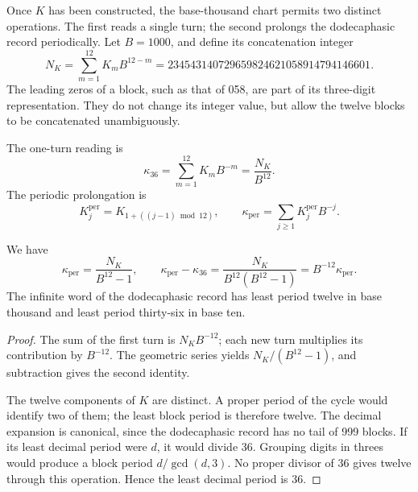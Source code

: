 Once \(K\) has been constructed, the base-thousand chart permits two
distinct operations. The first reads a single turn; the second prolongs the dodecaphasic record
periodically. Let \(B=1000\), and define its concatenation integer
\begin{equation}
 N_K=\sum_{m=1}^{12}K_mB^{12-m}
 =234543140729659824621058914794146601.
 \label{eq:k-numerador}
\end{equation}
The leading zeros of a block, such as that of 058, are part of its
three-digit representation. They do not change its integer value, but allow
the twelve blocks to be concatenated unambiguously.

\begin{definition}
\label{def:k-kappas}
The one-turn reading is
\[
 \kappa_{36}=\sum_{m=1}^{12}K_mB^{-m}=\frac{N_K}{B^{12}}.
\]
The periodic prolongation is
\[
 K_j^{\mathrm{per}}=K_{1+((j-1)\bmod12)},\qquad
 \kappa_{\mathrm{per}}=\sum_{j\geq1}K_j^{\mathrm{per}}B^{-j}.
\]
\end{definition}

\begin{proposition}
\label{prop:k-periodo}
We have
\begin{equation}
 \kappa_{\mathrm{per}}=\frac{N_K}{B^{12}-1},\qquad
 \kappa_{\mathrm{per}}-\kappa_{36}
 =\frac{N_K}{B^{12}(B^{12}-1)}
 =B^{-12}\kappa_{\mathrm{per}}.
 \label{eq:k-diferencia-kappas}
\end{equation}
The infinite word of the dodecaphasic record has least period twelve in base thousand and
least period thirty-six in base ten.
\end{proposition}

\begin{proof}
The sum of the first turn is \(N_KB^{-12}\); each new turn
multiplies its contribution by \(B^{-12}\). The geometric series yields
\(N_K/(B^{12}-1)\), and subtraction gives the second identity.

The twelve components of \(K\) are distinct. A proper period of the cycle
would identify two of them; the least block period is therefore
twelve. The decimal expansion is canonical, since the dodecaphasic record has no tail
of 999 blocks. If its least decimal period were \(d\), it would divide
36. Grouping digits in threes would produce a block period
\(d/\gcd(d,3)\). No proper divisor of 36 gives twelve through this
operation. Hence the least decimal period is 36.
\end{proof}

